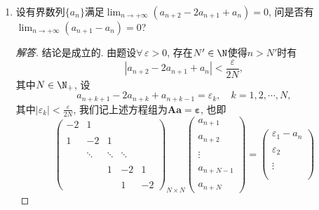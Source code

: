 \begin{6a}
\begin{enumerate}
\begin{proof}
\[\begin{aligned}
		f(x+h)&=f(x)+f(x)h+\frac{f''(x)}{2}h^2+\frac{f'''(\xi_1)}{6}h^3,\quad \xi_1\in(x,x+h),\\
		f(x-h)&=f(x)-f(x)h+\frac{f''(x)}{2}h^2-\frac{f'''(\xi_2)}{6}h^3,\quad \xi_2\in(x-h,x),
	\end{aligned}\]设\(M\)是\(|f(x)|\)的一个上界, 即有
    \[\begin{aligned}
	|f''(x)|&=\left|\frac{f(x+h)+f(x-h)-2f(x)-h^3(f'''(\xi_1)-f'''(\xi_2))/6}{h^2}\right|\\
    &\leqslant\frac{4M+\varepsilon}{h^2}\rightarrow 0,\quad h\rightarrow+\infty.
	\end{aligned}\]
\end{proof}
\item 设有界数列\(\{a_n\}\)满足\(\lim_{n\rightarrow+\infty}\left(a_{n+2}-2a_{n+1}+a_n\right)=0\), 
问是否有\(\lim_{n\rightarrow+\infty}\left(a_{n+1}-a_n\right)=0\)?
\begin{proof}[解答]
	结论是成立的. 由题设\(\forall\,\varepsilon>0\), 存在\(N'\in\N\)使得\(n>N'\)时有
    \[\left|a_{n+2}-2a_{n+1}+a_{n}\right|<\frac{\varepsilon}{2N},\]
    其中\(N\in\N_+\), 设
    \[a_{n+k+1}-2a_{n+k}+a_{n+k-1}=\varepsilon_{k},\quad k=1,2,\cdots,N,\]
    其中\(|\varepsilon_{k}|<\frac{\varepsilon}{2N}\), 
    我们记上述方程组为\(\boldsymbol{A}\boldsymbol{a}=\boldsymbol{\varepsilon}\), 
    也即\[\begin{pmatrix}
	-2&	1&	&	& \\ \\
	 1&	-2&	1&	& \\ \\
	  &	\ddots&	\ddots&	\ddots&	\\ \\
	  & &1&-2&1\\ \\
	  & & &1 &-2
	\end{pmatrix}_{N\times N}\begin{pmatrix}
	a_{n+1}\\ \\a_{n+2}\\ \\\vdots\\ \\a_{n+N-1}\\ \\a_{n+N}
	\end{pmatrix}=\begin{pmatrix}
	\varepsilon_1-a_n\\ \\\varepsilon_2\\ \\\vdots\\ \\

\end{pmatrix}\]
\end{proof}
\end{enumerate}
\end{6a}
